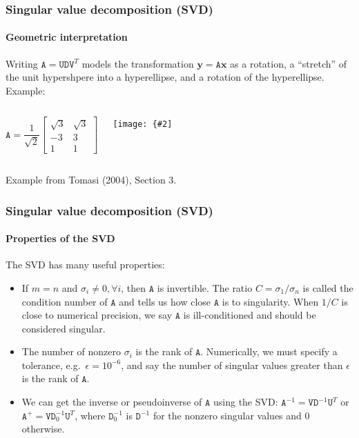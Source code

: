 \documentclass[aspectratio=169]{beamer}
\renewcommand{\vec}[1]{\boldsymbol{#1}}
\newcommand{\mat}[1]{\mathtt{#1}}
\newcommand{\myfig}[3]{\centerline{\texttt{[image: \{\#2]}}}
\begin{document}
\begin{frame}
\frametitle{Singular value decomposition (SVD)}
\framesubtitle{Geometric interpretation}

Writing $\mat{A}=\mat{U}\mat{D}\mat{V}^T$ models the transformation
$\vec{y}=\mat{A}\vec{x}$ as a rotation, a ``stretch'' of the unit
hypershpere into a hyperellipse, and a rotation of the hyperellipse.
Example:

\begin{columns}
\column{1.1in}
\begin{equation*}
\mat{A} = \frac{1}{\sqrt{2}}
\begin{bmatrix}
\sqrt{3} & \sqrt{3} \\
-3 & 3 \\
1 & 1
\end{bmatrix}
\end{equation*}

\column{2.6in}
\myfig{2.5in}{Tomasi-fig3-2}{}

\end{columns}

\vspace{-0.25in}

\centerline{\scriptsize Example from Tomasi (2004), Section 3.}

\end{frame}

\begin{frame}
\frametitle{Singular value decomposition (SVD)}
\framesubtitle{Properties of the SVD}

The SVD has many useful properties:
\begin{itemize}
\item If $m=n$ and $\sigma_i \not= 0, \forall i$, then $\mat{A}$ is
  \alert{invertible}.  The ratio $C=\sigma_1/\sigma_n$ is called the
  \alert{condition number} of $\mat{A}$ and tells us how close
  $\mat{A}$ is to singularity.  When $1/C$ is close to numerical
  precision, we say $\mat{A}$ is \alert{ill-conditioned} and should be
  considered singular.
\item The number of nonzero $\sigma_i$ is the \alert{rank} of
  $\mat{A}$.  Numerically, we must specify a tolerance, e.g.\
  $\epsilon=10^{-6}$, and say the number of singular values greater
  than $\epsilon$ is the rank of $\mat{A}$.
\item We can get the \alert{inverse} or \alert{pseudoinverse} of
  $\mat{A}$ using the SVD: $\mat{A}^{-1}=\mat{V}\mat{D}^{-1}\mat{U}^T$
  or $\mat{A}^+ = \mat{V}\mat{D}_0^{-1}\mat{U}^T$, where
  $\mat{D}_0^{-1}$ is $\mat{D}^{-1}$ for the nonzero singular values
  and 0 otherwise.
\end{itemize}

\end{frame}
\end{document}
